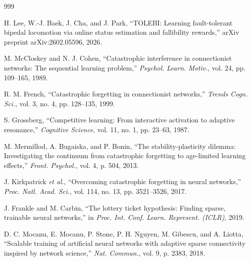 \documentclass[12pt,a4paper,oneside]{report}
\begin{document}
\begin{thebibliography}{999}

H. Lee, W.-J. Baek, J. Cha, and J. Park, ``{TOLEBI}: Learning fault-tolerant bipedal locomotion via online status estimation and fallibility rewards,'' arXiv preprint arXiv:2602.05596, 2026.




M. McCloskey and N. J. Cohen, ``Catastrophic interference in connectionist networks: The sequential learning problem,'' \textit{Psychol. Learn. Motiv.}, vol. 24, pp. 109--165, 1989.




R. M. French, ``Catastrophic forgetting in connectionist networks,'' \textit{Trends Cogn. Sci.}, vol. 3, no. 4, pp. 128--135, 1999.




S. Grossberg, ``Competitive learning: From interactive activation to adaptive resonance,'' \textit{Cognitive Science}, vol. 11, no. 1, pp. 23--63, 1987.




M. Mermillod, A. Bugaiska, and P. Bonin, ``The stability-plasticity dilemma: Investigating the continuum from catastrophic forgetting to age-limited learning effects,'' \textit{Front. Psychol.}, vol. 4, p. 504, 2013.




J. Kirkpatrick \textit{et al.}, ``Overcoming catastrophic forgetting in neural networks,'' \textit{Proc. Natl. Acad. Sci.}, vol. 114, no. 13, pp. 3521--3526, 2017.




J. Frankle and M. Carbin, ``The lottery ticket hypothesis: Finding sparse, trainable neural networks,'' in \textit{Proc. Int. Conf. Learn. Represent. (ICLR)}, 2019.




D. C. Mocanu, E. Mocanu, P. Stone, P. H. Nguyen, M. Gibescu, and A. Liotta, ``Scalable training of artificial neural networks with adaptive sparse connectivity inspired by network science,'' \textit{Nat. Commun.}, vol. 9, p. 2383, 2018.




\end{thebibliography}
\end{document}
